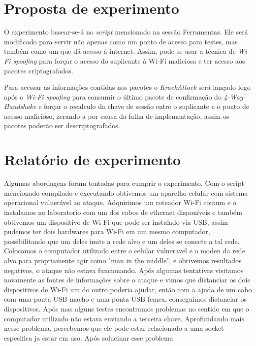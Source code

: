 \documentclass[12pt]{article}
\begin{document}
\section{Proposta de experimento}
O experimento basear-se-á no \textit{script} mencionado na sessão Ferramentas. Ele será modificado para servir não apenas como um ponto de acesso para testes, mas também como um que dá acesso à internet. Assim, pode-se usar a técnica de \textit{Wi-Fi spoofing} para forçar o acesso do suplicante à Wi-Fi maliciosa e ter acesso aos pacotes criptografados.

Para acessar as informações contidas nos pacotes o \textit{KrackAttack} será lançado logo após o \textit{Wi-Fi spoofing} para consumir o último pacote de confirmação do \textit{4-Way-Handshake} e forçar o recalculo da chave de sessão entre o suplicante e o ponto de acesso malicioso, zerando-a por causa da falha de implementação, assim os pacotes poderão ser descriptografados.

\section{Relatório de experimento}
Algumas abordagens foram tentadas para cumprir o experimento. Com o script mencionado compilado e executando obtivemos um aparelho celular com sistema operacional vulnerável ao ataque. Adquirimos um roteador Wi-Fi comum e o instalamos no laboratorio com um dos cabos de ethernet disponíveis e também obtivemos um dispositivo de Wi-Fi que pode ser instalado via USB, assim pudemos ter dois hardwares para Wi-Fi em um mesmo computador, possibilitando que um deles imite a rede alvo e um deles se conecte a tal rede. Colocamos o computador utilizado entre o celular vulneravel e o moden da rede alvo para propriamente agir como "man in the middle", e obtivemos resultados negativos, o ataque não estava funcionando. Após algumas tentativas visitamos novamente as fontes de informações sobre o ataque e vimos que distanciar os dois dispositivos de Wi-Fi um do outro poderia ajudar, então com a ajuda de um cabo com uma ponta USB macho e uma ponta USB femea, conseguimos distanciar os dispositivos. Após mas alguns testes encontramos problemas no sentido em que o computador utilizado não estava enviando a terceira chave. Aprofundando mais nesse problema, percebemos que ele pode estar relacionado a uma socket especifica ja estar em uso. Após solucinar esse problema



\end{document}
